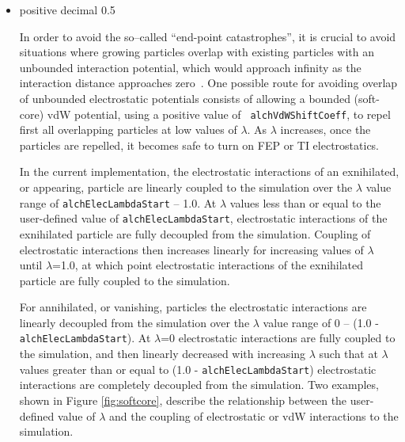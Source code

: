 \begin{itemize}
\item
{}
{positive decimal}
{0.5} %
{In order to avoid the so--called ``end-point catastrophes'', it is crucial to
avoid situations where growing particles overlap with existing particles with
an unbounded interaction potential, which would approach infinity as the
interaction distance approaches zero~\cite{Beutler1994,Chipot2007}. One possible route for
avoiding overlap of unbounded electrostatic potentials consists of allowing a
bounded (soft-core) vdW potential, using a positive value of {\tt
alchVdWShiftCoeff}, to repel first all overlapping particles at low values of
$\lambda$. As $\lambda$ increases, once the particles are repelled, it becomes
safe to turn on FEP or TI electrostatics. 

In the current implementation, the electrostatic interactions of an exnihilated, or appearing, particle are linearly coupled to the simulation over the $\lambda$ value range of {\tt alchElecLambdaStart} -- 1.0. At $\lambda$ values less than or equal to the user-defined value of {\tt alchElecLambdaStart}, electrostatic interactions of the exnihilated particle are fully decoupled from the simulation.  Coupling of electrostatic interactions then increases linearly for increasing values of $\lambda$ until $\lambda$=1.0, at which point electrostatic interactions of the exnihilated particle are fully coupled to the simulation.  

For annihilated, or vanishing, particles the electrostatic interactions are linearly decoupled from the simulation over the $\lambda$ value range of 0 -- (1.0 - {\tt alchElecLambdaStart}). At $\lambda$=0 electrostatic interactions are fully coupled to the simulation, and then linearly decreased with increasing $\lambda$ such that at $\lambda$ values greater than or equal to (1.0 - {\tt alchElecLambdaStart}) electrostatic interactions are completely decoupled from the simulation.  Two examples, shown in Figure \ref{fig:softcore}, describe the relationship between the user-defined value of $\lambda$ and the coupling of electrostatic or vdW interactions to the simulation. }


\end{itemize}
